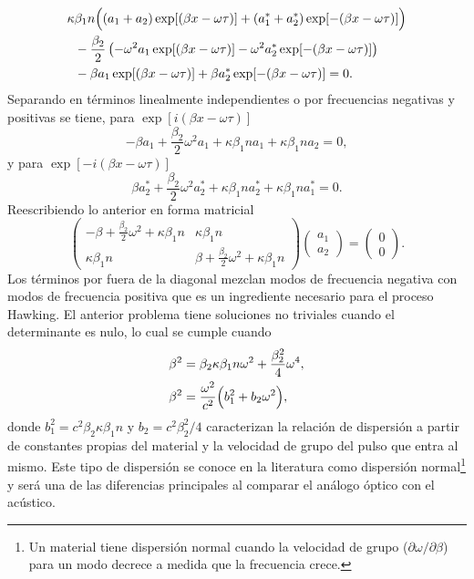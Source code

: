 \begin{align}
\kappa&\beta_1 n\Bigl((a_1+a_2)\exp[(\beta x-\omega \tau)]+(a_1^*+a_2^*)\exp[-(\beta x-\omega \tau)]\Bigr)\\
\nonumber&-\frac{\beta_2}{2}\left(-\omega^2 a_1\exp[(\beta x-\omega \tau)]-\omega^2a_2^*\exp[-(\beta x-\omega \tau)]\right) \\
\nonumber& -\beta a_1\exp[(\beta x-\omega \tau)]+\beta a_2^*\exp[-(\beta x-\omega \tau)]=0.
\end{align}
Separando en t\'{e}rminos linealmente independientes o por frecuencias negativas y positivas se tiene, para $\exp[i(\beta x-\omega \tau)]$
\begin{equation}
-\beta a_1+\frac{\beta_2}{2}\omega^2 a_1+\kappa\beta_1 n a_1+\kappa\beta_1 n a_2=0,
\end{equation}
y para $\exp[-i(\beta x-\omega \tau)]$
\begin{equation}
\beta a_2^* +\frac{\beta_2}{2}\omega^2 a_2^*+\kappa\beta_1 n a_2^*+\kappa\beta_1 n a_1^*=0.
\end{equation}
Reescribiendo lo anterior en forma matricial
\begin{equation}
\begin{pmatrix}
-\beta+\displaystyle \frac{\beta_2}{2}\omega^2+\kappa\beta_1 n &\kappa\beta_1 n\\
\kappa\beta_1 n &\beta+ \displaystyle\frac{\beta_2}{2}\omega^2+\kappa\beta_1 n
\end{pmatrix}\begin{pmatrix}
a_1\\
a_2
\end{pmatrix}=\begin{pmatrix}
0\\
0  
\end{pmatrix}.
\end{equation}
Los t\'{e}rminos por fuera de la diagonal mezclan modos de frecuencia negativa con modos de frecuencia positiva que es un ingrediente necesario para el proceso Hawking. El anterior problema tiene soluciones no triviales cuando el determinante es nulo, lo cual se cumple cuando
\begin{align}
\beta^2&=\beta_2\kappa\beta_1 n\omega^2+\frac{\beta_2^2}{4}\omega^4,\\
\beta^2&=\frac{\omega^2}{c^2}\Bigl(b_1^2+b_2\omega^2\Bigr),\label{ec:gaona}
\end{align}
donde $b_1^2= c^2 \beta_2\kappa \beta_1 n$ y $b_2=c^2\beta_2^2/4$ caracterizan la relaci\'{o}n de dispersi\'{o}n a partir de constantes propias del material y la velocidad de grupo del pulso que entra al mismo. Este tipo de dispersi\'{o}n se conoce en la literatura como dispersi\'{o}n normal\footnote{Un material tiene dispersi\'{o}n normal cuando la velocidad de grupo ($\partial \omega/\partial \beta$) para un modo decrece a medida que la frecuencia crece.} y ser\'{a} una de las diferencias principales al comparar el an\'{a}logo \'{o}ptico con el ac\'{u}stico.\\
